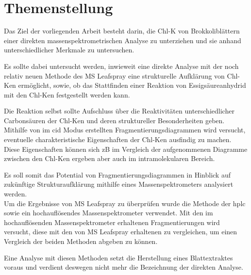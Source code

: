 \chapter{Themenstellung} \label{sec:Themenstellung}

Das Ziel der vorliegenden Arbeit besteht darin, die \gls{Chl-K} von Brokkoliblättern einer direkten massenspektrometrischen Analyse zu unterziehen und sie anhand unterschiedlicher Merkmale zu untersuchen.

Es sollte dabei untersucht werden, inwieweit eine direkte Analyse mit der noch relativ neuen Methode des MS Leafspray eine strukturelle Aufklärung von \gls{Chl-K}en ermöglicht, sowie, ob das Stattfinden einer Reaktion von Essigsäureanhydrid mit den \gls{Chl-K}en festgestellt werden kann. 

Die Reaktion selbst sollte Aufschluss über die Reaktivitäten unterschiedlicher Carbonsäuren der \gls{Chl-K}en und deren struktureller Besonderheiten geben. \\

Mithilfe von im \gls{cid} Modus erstellten Fragmentierungsdiagrammen wird versucht, eventuelle charakteristische Eigenschaften der \gls{Chl-K}en ausfindig zu machen. Diese Eigenschaften können sich \gls{zB} im Vergleich der aufgenommenen Diagramme zwischen den \gls{Chl-K}en ergeben aber auch im intramolekularen Bereich. 

Es soll somit das Potential von Fragmentierungsdiagrammen in Hinblick auf zukünftige Strukturaufklärung mithilfe eines Massenspektrometers analysiert werden. \\

Um die Ergebnisse von MS Leafspray zu überprüfen wurde die Methode der \gls{hplc} sowie ein hochauflösendes Massenspektrometer verwendet. Mit den im hochauflösenden Massenspektrometer erhaltenen Fragmentierungen wird versucht, diese mit den von MS Leafspray erhaltenen zu vergleichen, um einen Vergleich der beiden Methoden abgeben zu können.

Eine Analyse mit diesen Methoden setzt die Herstellung eines Blattextraktes voraus und verdient deswegen nicht mehr die Bezeichnung der direkten Analyse.




